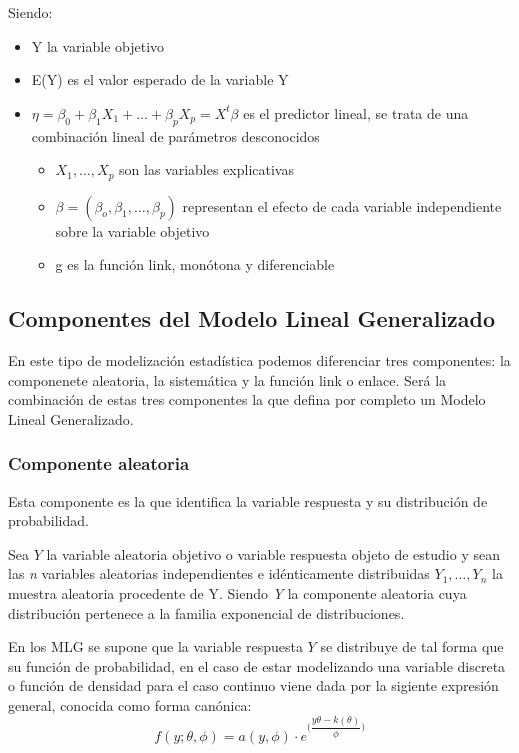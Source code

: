 \documentclass[12pt,a4paper,]{book}
\providecommand{\tightlist}{%
  \setlength{\itemsep}{0pt}\setlength{\parskip}{0pt}}
\numberwithin{dummy}{section}
\theoremstyle{ocrenumbox}
\theoremstyle{blacknumex}
\theoremstyle{blacknumbox}
\theoremstyle{ocrenum}
\theoremstyle{ocrenum}
\begin{document}
Siendo:

\begin{itemize}
\item
  Y la variable objetivo
\item
  E(Y) es el valor esperado de la variable Y
\item
  \(\eta = \beta_0 + \beta_1X_1+ \dots + \beta_pX_p= X^t\beta\) es el
  predictor lineal, se trata de una combinación lineal de parámetros
  desconocidos

  \begin{itemize}
  \tightlist
  \item
    \(X_1,\dots,X_p\) son las variables explicativas
  \item
    \(\beta = (\beta_o,\beta_1,\dots,\beta_p)\) representan el efecto de
    cada variable independiente sobre la variable objetivo
  \item
    g es la función link, monótona y diferenciable
  \end{itemize}
\end{itemize}

\hypertarget{componentes-del-modelo-lineal-generalizado}{%
\subsection{Componentes del Modelo Lineal
Generalizado}\label{componentes-del-modelo-lineal-generalizado}}

En este tipo de modelización estadística podemos diferenciar tres
componentes: la componenete aleatoria, la sistemática y la función link
o enlace. Será la combinación de estas tres componentes la que defina
por completo un Modelo Lineal Generalizado.

\hypertarget{componente-aleatoria}{%
\subsubsection{Componente aleatoria}\label{componente-aleatoria}}

Esta componente es la que identifica la variable respuesta y su
distribución de probabilidad.

Sea \(Y\) la variable aleatoria objetivo o variable respuesta objeto de
estudio y sean las \emph{n} variables aleatorias independientes e
idénticamente distribuidas \(Y_1,\dots,Y_n\) la muestra aleatoria
procedente de Y. Siendo \emph{Y} la componente aleatoria cuya
distribución pertenece a la familia exponencial de distribuciones.

En los MLG se supone que la variable respuesta \(Y\) se distribuye de
tal forma que su función de probabilidad, en el caso de estar
modelizando una variable discreta o función de densidad para el caso
continuo viene dada por la sigiente expresión general, conocida como
forma canónica: \[
f(y;\theta, \phi) = a(y,\phi)\cdot e^{\Bigg(\dfrac{y \theta - k(\theta)}{\phi}\Bigg)}
\]
\end{document}
